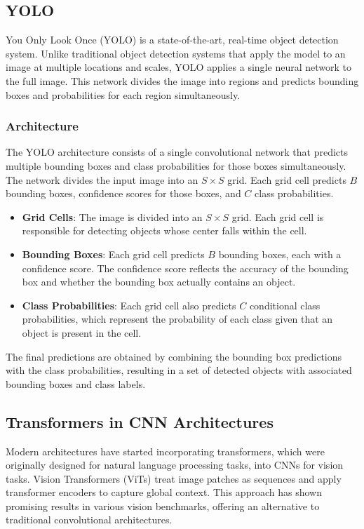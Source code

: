 \documentclass[12pt]{article}
\begin{document}
\subsection{YOLO}
You Only Look Once (YOLO) is a state-of-the-art, real-time object detection system. Unlike traditional object detection systems that apply the model to an image at multiple locations and scales, YOLO applies a single neural network to the full image. This network divides the image into regions and predicts bounding boxes and probabilities for each region simultaneously.

\subsubsection{Architecture}
The YOLO architecture consists of a single convolutional network that predicts multiple bounding boxes and class probabilities for those boxes simultaneously. The network divides the input image into an \( S \times S \) grid. Each grid cell predicts \( B \) bounding boxes, confidence scores for those boxes, and \( C \) class probabilities.

\begin{itemize}
    \item \textbf{Grid Cells}: The image is divided into an \( S \times S \) grid. Each grid cell is responsible for detecting objects whose center falls within the cell.
    \item \textbf{Bounding Boxes}: Each grid cell predicts \( B \) bounding boxes, each with a confidence score. The confidence score reflects the accuracy of the bounding box and whether the bounding box actually contains an object.
    \item \textbf{Class Probabilities}: Each grid cell also predicts \( C \) conditional class probabilities, which represent the probability of each class given that an object is present in the cell.
\end{itemize}

The final predictions are obtained by combining the bounding box predictions with the class probabilities, resulting in a set of detected objects with associated bounding boxes and class labels.

\subsection{Transformers in CNN Architectures}
Modern architectures have started incorporating transformers, which were originally designed for natural language processing tasks, into CNNs for vision tasks. Vision Transformers (ViTs) treat image patches as sequences and apply transformer encoders to capture global context. This approach has shown promising results in various vision benchmarks, offering an alternative to traditional convolutional architectures.
\end{document}
